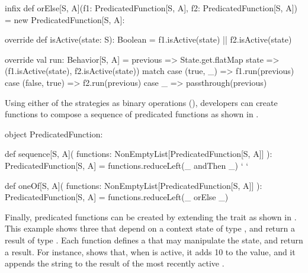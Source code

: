 \begin{scala}[label=lst:predicated-function-orElse, caption=Alternating between Predicated Functions]
infix def orElse[S, A](f1: PredicatedFunction[S, A], f2: PredicatedFunction[S, A]) = new PredicatedFunction[S, A]:

  override def isActive(state: S): Boolean =
  f1.isActive(state) || f2.isActive(state)

  override val run: Behavior[S, A] = previous =>
  State.get.flatMap { state =>
    (f1.isActive(state), f2.isActive(state)) match
      case (true, _)     => f1.run(previous)
      case (false, true) => f2.run(previous)
      case _             => passthrough(previous)
  }
\end{scala}

Using either of the strategies as binary operations (\eg {}), developers can create 
functions to compose a sequence of predicated functions as shown in 
.

\begin{scala}[label=lst:predicated-function-compose-multiple, caption=Composing multiple predicated functions]
object PredicatedFunction:

  def sequence[S, A](
      functions: NonEmptyList[PredicatedFunction[S, A]]
  ): PredicatedFunction[S, A] =
    functions.reduceLeft(_ andThen _) `\label{ln:andthen-line} `

  def oneOf[S, A](
      functions: NonEmptyList[PredicatedFunction[S, A]]
  ): PredicatedFunction[S, A] =
    functions.reduceLeft(_ orElse _)
\end{scala}

Finally, predicated functions can be created by extending the  trait as
shown in . This example shows three 
 that depend on a context state of type , and return a result of 
type . Each function defines a  that may manipulate the state, and 
return a result. For instance,  shows that, when 
 is active, it adds 10 to the  value, and it appends the 
 string to the result of the most recently active .

